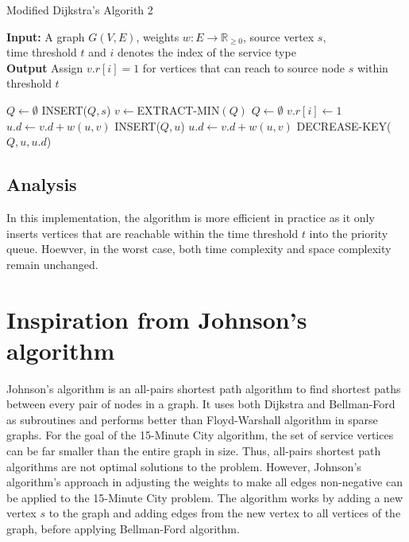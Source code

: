 \begin{algorithm}[H]
    \caption{Modified Dijkstra's Algorith 2} \label{alg:modified_dijsktra2}
    \textbf{Input:} A graph $G(V,E)$, weights $w:E\rightarrow\mathbb{R}_{\geq 0}$, source vertex $s$, \\  time threshold $t$ and $i$ denotes the index of the service type\\
    \textbf{Output} Assign $v.r[i]=1$ for vertices that can reach to source node $s$ within threshold $t$ %
    \begin{algorithmic}
        \State $Q\gets\emptyset$ 
        \State INSERT($Q,s$)
            \State $v\gets$EXTRACT-MIN$(Q)$
                \State $Q\gets\emptyset$ 
            \Else
                \State $v.r[i] \gets 1$
                        \State $u.d\gets v.d+w(u,v)$ %
                        \State INSERT($Q,u$)
                        \State $u.d\gets v.d+w(u,v)$
                        \State DECREASE-KEY($Q,u,u.d$)
                    \EndIf
                \EndFor
            \EndIf
        \EndWhile
    \end{algorithmic}
\end{algorithm}

\subsection{Analysis}

In this implementation, the algorithm is more efficient in practice as it only inserts vertices that are reachable within the time threshold $t$ into the priority queue. Hoewver, in the worst case, both time complexity and space complexity remain unchanged.

\section{Inspiration from Johnson's algorithm}

Johnson's algorithm is an all-pairs shortest path algorithm to find shortest paths between every pair of nodes in a graph. It uses both Dijkstra and Bellman-Ford as subroutines and performs better than Floyd-Warshall algorithm in sparse graphs. For the goal of the 15-Minute City algorithm, the set of service vertices can be far smaller than the entire graph in size. Thus, all-pairs shortest path algorithms are not optimal solutions to the problem. However, Johnson's algorithm's approach in adjusting the weights to make all edges non-negative can be applied to the 15-Minute City problem. The algorithm works by adding a new vertex $s$ to the graph and adding edges from the new vertex to all vertices of the graph, before applying Bellman-Ford algorithm.

